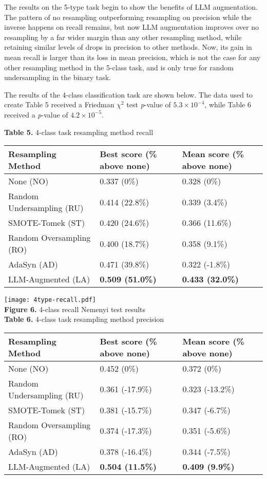 \documentclass[runningheads]{llncs}
\newenvironment{nscenter}
 {\parskip=0pt\par\nopagebreak\centering}
 {\par\noindent\ignorespacesafterend}
\begin{document}
The results on the 5-type task begin to show the benefits of LLM augmentation. The pattern of no resampling outperforming resampling on precision while the inverse happens on recall remains, but now LLM augmentation improves over no resampling by a far wider margin than any other resampling method, while retaining similar levels of drops in precision to other methods. Now, its gain in mean recall is larger than its loss in mean precision, which is not the case for any other resampling method in the 5-class task, and is only true for random undersampling in the binary task.

The results of the 4-class classification task are shown below. The data used to create Table 5 received a Friedman $\chi^2$ test \emph{p}-value of $5.3 \times 10^{-4}$, while Table 6 received a \emph{p}-value of $4.2 \times 10^{-5}$.
\begin{nscenter}
{\bf Table 5.} 4-class task resampling method recall\\

\begin{tabular}{|l|l|l|}
\hline
Resampling Method & Best score (\% above none) & Mean score (\% above none) \\\hline
None (NO) & 0.337 (0\%) & 0.328 (0\%) \\\hline
Random Undersampling (RU) & 0.414 (22.8\%) & 0.339 (3.4\%) \\\hline
SMOTE-Tomek (ST) & 0.420 (24.6\%) & 0.366 (11.6\%) \\\hline
Random Oversampling (RO) & 0.400 (18.7\%) & 0.358 (9.1\%) \\\hline
AdaSyn (AD) & 0.471 (39.8\%) & 0.322 (-1.8\%) \\\hline
LLM-Augmented (LA) & {\bf 0.509 (51.0\%)} & {\bf 0.433 (32.0\%)} \\\hline
\end{tabular}

\texttt{[image: 4type-recall.pdf]}\\
{\bf Figure 6.} 4-class recall Nemenyi test results\\
\vspace{\baselineskip}
{\bf Table 6.} 4-class task resampling method precision\\

\begin{tabular}{|l|l|l|}
\hline
Resampling Method & Best score (\% above none) & Mean score (\% above none) \\\hline
None (NO) & 0.452 (0\%) & 0.372 (0\%) \\\hline
Random Undersampling (RU) & 0.361 (-17.9\%) & 0.323 (-13.2\%) \\\hline
SMOTE-Tomek (ST) & 0.381 (-15.7\%) & 0.347 (-6.7\%) \\\hline
Random Oversampling (RO) & 0.374 (-17.3\%) & 0.351 (-5.6\%) \\\hline
AdaSyn (AD) & 0.378 (-16.4\%) & 0.344 (-7.5\%) \\\hline
LLM-Augmented (LA) & {\bf 0.504 (11.5\%)} & {\bf 0.409 (9.9\%)} \\\hline
\end{tabular}


\end{nscenter}
\end{document}
